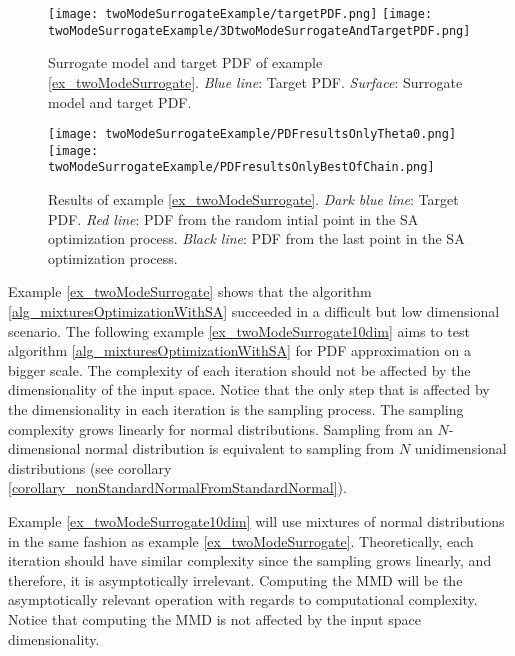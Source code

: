 \begin{figure}[!htbp]
  \centering
    \texttt{[image: twoModeSurrogateExample/targetPDF.png]} 
    \texttt{[image: twoModeSurrogateExample/3DtwoModeSurrogateAndTargetPDF.png]} 
  \caption[Example \ref{ex_twoModeSurrogate} - surrogate model and target PDF]
{
  Surrogate model and target PDF of example \ref{ex_twoModeSurrogate}.
  \emph{Blue line}: Target PDF. 
  \emph{Surface}: Surrogate model and target PDF. 
}
\label{fig_surrogateAndTargetPDF}
\end{figure}

\begin{figure}[!htbp]
  \centering
    \texttt{[image: twoModeSurrogateExample/PDFresultsOnlyTheta0.png]} 
    \texttt{[image: twoModeSurrogateExample/PDFresultsOnlyBestOfChain.png]} 
  \caption[Example \ref{ex_twoModeSurrogate} - results]
{
  Results of example \ref{ex_twoModeSurrogate}.
  \emph{Dark blue line}: Target PDF.
  \emph{Red line}: PDF from the random intial point in the SA optimization process. 
  \emph{Black line}: PDF from the last point in the SA optimization process. 
}
\label{fig_results}
\end{figure}

Example \ref{ex_twoModeSurrogate} shows that the algorithm \ref{alg_mixturesOptimizationWithSA} succeeded in a difficult but low dimensional scenario. The following example \ref{ex_twoModeSurrogate10dim} aims to test algorithm \ref{alg_mixturesOptimizationWithSA} for PDF approximation on a bigger scale. The complexity of each iteration should not be affected by the dimensionality of the input space. Notice that the only step that is affected by the dimensionality in each iteration is the sampling process. The sampling complexity grows linearly for normal distributions. Sampling from an $N$-dimensional normal distribution is equivalent to sampling from $N$ unidimensional distributions (see corollary \ref{corollary_nonStandardNormalFromStandardNormal}). 

Example \ref{ex_twoModeSurrogate10dim} will use mixtures of normal distributions in the same fashion as example \ref{ex_twoModeSurrogate}. Theoretically, each iteration should have similar complexity since the sampling grows linearly, and therefore, it is asymptotically irrelevant. Computing the MMD will be the asymptotically relevant operation with regards to computational complexity. Notice that computing the MMD is not affected by the input space dimensionality. 

